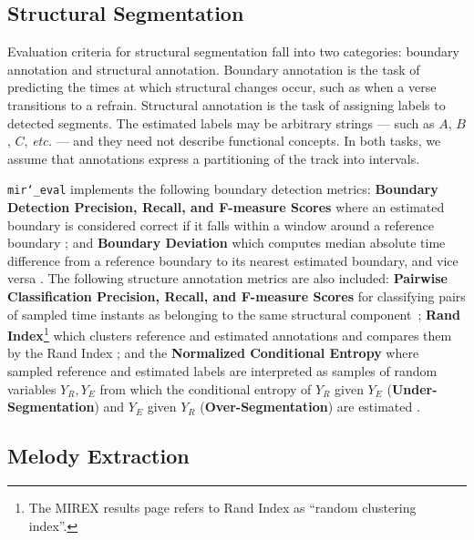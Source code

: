 \documentclass{article}
\def\etc{\emph{etc.}}
\def\mireval{\texttt{mir\char`_eval}}
\begin{document}
\subsection{Structural Segmentation}

Evaluation criteria for structural segmentation fall into two categories: boundary annotation and structural annotation.
Boundary annotation is the task of predicting the times at which structural changes occur, such as when a verse transitions to a refrain.
Structural annotation is the task of assigning labels to detected segments.
The estimated labels may be arbitrary strings --- such as $A$, $B$, $C$, \etc{} --- and they need not describe functional concepts.
In both tasks, we assume that annotations express a partitioning of the track into intervals.

\mireval{} implements the following boundary detection metrics:
\textbf{Boundary Detection Precision, Recall, and F-measure Scores} where an estimated boundary is considered correct if it falls within a window around a reference boundary \cite{turnbull2007supervised};
and \textbf{Boundary Deviation} which computes median absolute time difference from a reference boundary to its nearest estimated boundary, and vice versa \cite{turnbull2007supervised}.
The following structure annotation metrics are also included:
\textbf{Pairwise Classification Precision, Recall, and F-measure Scores} for classifying pairs of sampled time instants as belonging to the same structural component~\cite{levy2008structural};
\textbf{Rand Index}\footnote{The MIREX results page refers to Rand Index as ``random clustering index''.} which clusters reference and estimated annotations and compares them by the Rand Index \cite{rand1971objective};
and the \textbf{Normalized Conditional Entropy} where sampled reference and estimated labels are interpreted as samples of random variables $Y_R, Y_E$ from which the conditional entropy of $Y_R$ given $Y_E$ (\textbf{Under-Segmentation}) and $Y_E$ given $Y_R$  (\textbf{Over-Segmentation}) are estimated \cite{lukashevich2008towards}.

\subsection{Melody Extraction}
\end{document}
